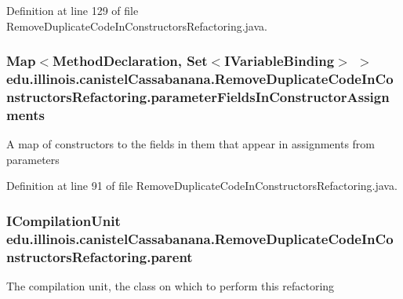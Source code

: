 Definition at line 129 of file RemoveDuplicateCodeInConstructorsRefactoring.java.

\hypertarget{classedu_1_1illinois_1_1canistelCassabanana_1_1RemoveDuplicateCodeInConstructorsRefactoring_a050a316f41a247e8477ef598a666ab22}{
\subsubsection[{parameterFieldsInConstructorAssignments}]{\setlength{\rightskip}{0pt plus 5cm}Map$<$MethodDeclaration, Set$<$IVariableBinding$>$ $>$ {\bf edu.illinois.canistelCassabanana.RemoveDuplicateCodeInConstructorsRefactoring.parameterFieldsInConstructorAssignments}}}
\label{classedu_1_1illinois_1_1canistelCassabanana_1_1RemoveDuplicateCodeInConstructorsRefactoring_a050a316f41a247e8477ef598a666ab22}
A map of constructors to the fields in them that appear in assignments from parameters 

Definition at line 91 of file RemoveDuplicateCodeInConstructorsRefactoring.java.

\hypertarget{classedu_1_1illinois_1_1canistelCassabanana_1_1RemoveDuplicateCodeInConstructorsRefactoring_acbe93b494e0487fdf5e6cc379b2fd0dc}{
\subsubsection[{parent}]{\setlength{\rightskip}{0pt plus 5cm}ICompilationUnit {\bf edu.illinois.canistelCassabanana.RemoveDuplicateCodeInConstructorsRefactoring.parent}}}
\label{classedu_1_1illinois_1_1canistelCassabanana_1_1RemoveDuplicateCodeInConstructorsRefactoring_acbe93b494e0487fdf5e6cc379b2fd0dc}
The compilation unit, the class on which to perform this refactoring 

